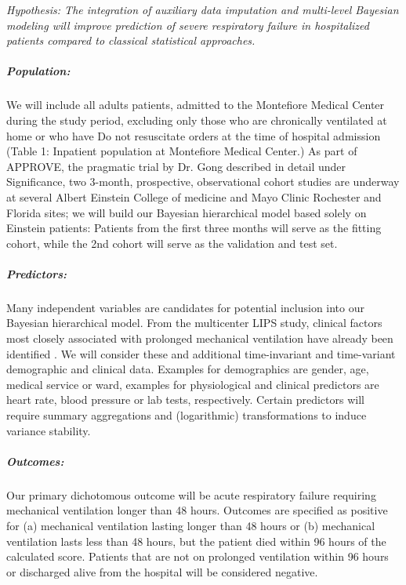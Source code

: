 \documentclass[11pt,notitlepage]{article}
\begin{document}
\begin{flushleft}
\textit{Hypothesis: The integration of auxiliary data imputation and multi-level Bayesian modeling will improve prediction of severe respiratory failure in hospitalized patients compared to classical statistical approaches.}
\end{flushleft}

\subparagraph*{Population:}
We will include all adults patients, admitted to the Montefiore Medical Center during the study period, excluding only those who are chronically ventilated at home or who have Do not resuscitate orders at the time of hospital admission (Table 1: Inpatient population at Montefiore Medical Center.) As part of APPROVE, the pragmatic trial by Dr. Gong described in detail under Significance, two 3-month, prospective, observational cohort studies are underway at several Albert Einstein College of medicine and Mayo Clinic Rochester and Florida sites; we will build our Bayesian hierarchical model based solely on Einstein patients: Patients from the first three months will serve as the fitting cohort, while the 2nd cohort will serve as the validation and test set.  

\subparagraph*{Predictors:}
Many independent variables are candidates for potential inclusion into our Bayesian hierarchical model. From the multicenter LIPS study, clinical factors most closely associated with prolonged mechanical ventilation have already been identified \cite{Herridge_12594312}. We will consider these and additional time-invariant and time-variant demographic and clinical data. Examples for demographics are gender, age, medical service or ward, examples for physiological and clinical predictors are heart rate, blood pressure or lab tests, respectively. Certain predictors will require summary aggregations and (logarithmic) transformations to induce variance stability.

\subparagraph*{Outcomes:}
Our primary dichotomous outcome will be acute respiratory failure requiring mechanical ventilation longer than 48 hours. Outcomes are specified as positive for (a) mechanical ventilation lasting longer than 48 hours or (b) mechanical ventilation lasts less than 48 hours, but the patient died within 96 hours of the calculated score. Patients that are not on prolonged ventilation within 96 hours or discharged alive from the hospital will be considered negative.
\end{document}
